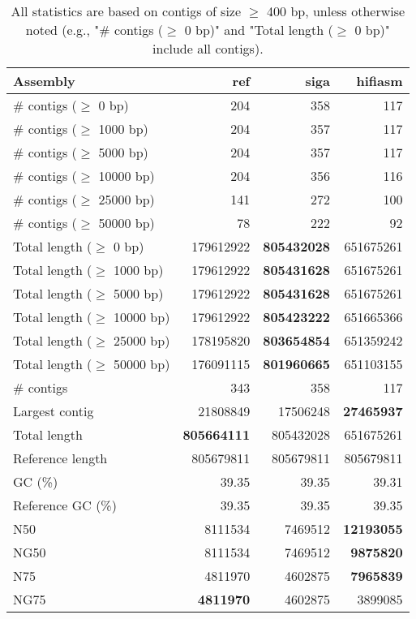 \documentclass[12pt,a4paper]{article}
\begin{document}
\begin{table}[ht]
\begin{center}
\caption{All statistics are based on contigs of size $\geq$ 400 bp, unless otherwise noted (e.g., "\# contigs ($\geq$ 0 bp)" and "Total length ($\geq$ 0 bp)" include all contigs).}
\begin{tabular}{|l*{3}{|r}|}
\hline
Assembly & ref & siga & hifiasm \\ \hline
\# contigs ($\geq$ 0 bp) & 204 & 358 & 117 \\ \hline
\# contigs ($\geq$ 1000 bp) & 204 & 357 & 117 \\ \hline
\# contigs ($\geq$ 5000 bp) & 204 & 357 & 117 \\ \hline
\# contigs ($\geq$ 10000 bp) & 204 & 356 & 116 \\ \hline
\# contigs ($\geq$ 25000 bp) & 141 & 272 & 100 \\ \hline
\# contigs ($\geq$ 50000 bp) & 78 & 222 & 92 \\ \hline
Total length ($\geq$ 0 bp) & 179612922 & {\bf 805432028} & 651675261 \\ \hline
Total length ($\geq$ 1000 bp) & 179612922 & {\bf 805431628} & 651675261 \\ \hline
Total length ($\geq$ 5000 bp) & 179612922 & {\bf 805431628} & 651675261 \\ \hline
Total length ($\geq$ 10000 bp) & 179612922 & {\bf 805423222} & 651665366 \\ \hline
Total length ($\geq$ 25000 bp) & 178195820 & {\bf 803654854} & 651359242 \\ \hline
Total length ($\geq$ 50000 bp) & 176091115 & {\bf 801960665} & 651103155 \\ \hline
\# contigs & 343 & 358 & 117 \\ \hline
Largest contig & 21808849 & 17506248 & {\bf 27465937} \\ \hline
Total length & {\bf 805664111} & 805432028 & 651675261 \\ \hline
Reference length & 805679811 & 805679811 & 805679811 \\ \hline
GC (\%) & 39.35 & 39.35 & 39.31 \\ \hline
Reference GC (\%) & 39.35 & 39.35 & 39.35 \\ \hline
N50 & 8111534 & 7469512 & {\bf 12193055} \\ \hline
NG50 & 8111534 & 7469512 & {\bf 9875820} \\ \hline
N75 & 4811970 & 4602875 & {\bf 7965839} \\ \hline
NG75 & {\bf 4811970} & 4602875 & 3899085 \\ \hline

\end{tabular}
\end{center}
\end{table}
\end{document}

